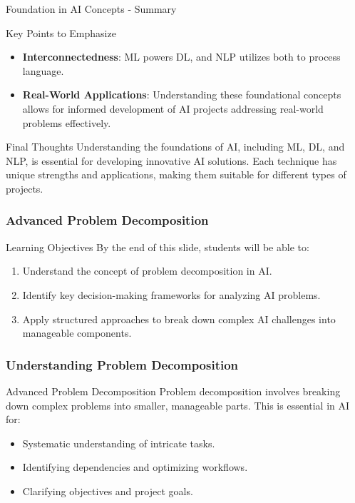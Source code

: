 \documentclass[aspectratio=169]{beamer}
\begin{document}
\begin{frame}[fragile]{Foundation in AI Concepts - Summary}
    \begin{block}{Key Points to Emphasize}
        \begin{itemize}
            \item \textbf{Interconnectedness}: ML powers DL, and NLP utilizes both to process language.
            \item \textbf{Real-World Applications}: Understanding these foundational concepts allows for informed development of AI projects addressing real-world problems effectively.
        \end{itemize}
    \end{block}

    \begin{block}{Final Thoughts}
        Understanding the foundations of AI, including ML, DL, and NLP, is essential for developing innovative AI solutions. Each technique has unique strengths and applications, making them suitable for different types of projects.
    \end{block}
\end{frame}

\begin{frame}[fragile]
    \frametitle{Advanced Problem Decomposition}
    
    \begin{block}{Learning Objectives}
        By the end of this slide, students will be able to:
        \begin{enumerate}
            \item Understand the concept of problem decomposition in AI.
            \item Identify key decision-making frameworks for analyzing AI problems.
            \item Apply structured approaches to break down complex AI challenges into manageable components.
        \end{enumerate}
    \end{block}
\end{frame}

\begin{frame}[fragile]
    \frametitle{Understanding Problem Decomposition}
    
    \begin{block}{Advanced Problem Decomposition}
        Problem decomposition involves breaking down complex problems into smaller, manageable parts. This is essential in AI for:
        \begin{itemize}
            \item Systematic understanding of intricate tasks.
            \item Identifying dependencies and optimizing workflows.
            \item Clarifying objectives and project goals.
        \end{itemize}
    \end{block}
\end{frame}
\end{document}
